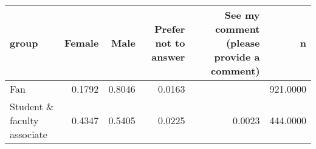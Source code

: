 \begin{tabular}{lrrrrr}
  \hline
group & Female & Male & Prefer not to answer & See my comment (please provide a comment) & n \\ 
  \hline
Fan & 0.1792 & 0.8046 & 0.0163 &  & 921.0000 \\ 
  Student \& faculty associate & 0.4347 & 0.5405 & 0.0225 & 0.0023 & 444.0000 \\ 
   \hline
\end{tabular}
